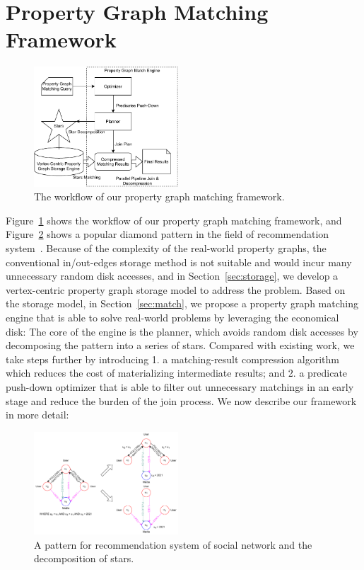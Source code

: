 \section{Property Graph Matching Framework}\label{sec:framework}
\begin{figure}[ht]
  \centering
  \includegraphics[width=0.48\textwidth]{img/architecture.pdf}
  \caption{The workflow of our property graph matching framework.}\label{img:architecture}
\end{figure}
Figure~\ref{img:architecture} shows the workflow of our property graph matching framework,
and Figure~\ref{img:pattern_graph} shows a popular diamond pattern in the field of recommendation system~\cite{DBLP:journals/pvldb/GuptaSGGZLL14,DBLP:journals/pvldb/SharmaJBLL16}.
Because of the complexity of the real-world property graphs,
the conventional in/out-edges storage method is not suitable and would incur many unnecessary random disk accesses,
and in Section~\ref{sec:storage}, we develop a vertex-centric property graph storage model to address the problem.
Based on the storage model, in Section~\ref{sec:match},
we propose a property graph matching engine that is able to solve real-world problems by leveraging the economical disk:
The core of the engine is the planner, which avoids random disk accesses by decomposing the pattern into a series of stars.
Compared with existing work, we take steps further by introducing
1\@. a matching-result compression algorithm which reduces the cost of materializing intermediate results;
and 2\@. a predicate push-down optimizer that is able to filter out unnecessary matchings in an early stage and reduce the burden of the join process.
We now describe our framework in more detail:
\begin{figure}[ht]
  \centering
  \includegraphics[width=0.48\textwidth]{img/pattern_graph.pdf}
  \caption{A pattern for recommendation system of social network and the decomposition of stars.}\label{img:pattern_graph}
\end{figure}

